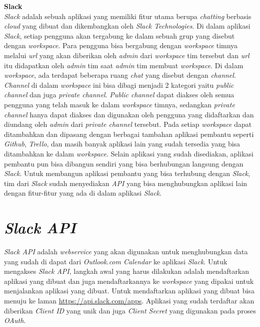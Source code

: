 \textbf{Slack}\\
\textit{Slack} adalah sebuah aplikasi yang memiliki fitur utama berupa \textit{chatting} berbasis \textit{cloud} yang dibuat dan dikembangkan oleh \textit{Slack Technologies}. Di dalam aplikasi \textit{Slack}, setiap pengguna akan tergabung ke dalam sebuah grup yang disebut dengan \textit{workspace}. Para pengguna bisa bergabung dengan \textit{workspace} timnya melalui \textit{url} yang akan diberikan oleh \textit{admin} dari \textit{workspace} tim tersebut dan \textit{url} itu didapatkan oleh \textit{admin} tim saat \textit{admin} tim membuat \textit{workspace}. Di dalam \textit{workspace}, ada terdapat beberapa ruang \textit{chat} yang disebut dengan \textit{channel}. \textit{Channel} di dalam \textit{workspace} ini bisa dibagi menjadi 2 kategori yaitu \textit{public channel} dan juga \textit{private channel}. \textit{Public channel} dapat diakses oleh semua pengguna yang telah masuk ke dalam \textit{workspace} timnya, sedangkan \textit{private channel} hanya dapat diakses dan digunakan oleh pengguna yang didaftarkan dan diundang oleh \textit{admin} dari \textit{private channel} tersebut. Pada setiap \textit{workspace} dapat ditambahkan dan dipasang dengan berbagai tambahan aplikasi pembantu seperti \textit{Github}, \textit{Trello}, dan masih banyak aplikasi lain yang sudah tersedia yang bisa ditambahkan ke dalam \textit{workspace}. Selain aplikasi yang sudah disediakan, aplikasi pembantu pun bisa dibangun sendiri yang bisa berhubungan langsung dengan \textit{Slack}. Untuk membangun aplikasi pembantu yang bisa terhubung dengan \textit{Slack}, tim dari \textit{Slack} sudah menyediakan \textit{API} yang bisa menghubungkan aplikasi lain dengan fitur-fitur yang ada di dalam aplikasi \textit{Slack}. 

\section{\textit{Slack API}}
\label{sec:slackAPI}
\textit{Slack API} adalah \textit{webservice} yang akan digunakan untuk menghubungkan data yang sudah di dapat dari \textit{Outlook.com Calendar} ke aplikasi \textit{Slack}.\cite{slack} Untuk mengakses \textit{Slack API}, langkah awal yang harus dilakukan adalah mendaftarkan aplikasi yang dibuat dan juga mendaftarkannya ke \textit{workspace} yang dipakai untuk menjalankan aplikasi yang dibuat. Untuk mendaftarkan aplikasi yang dibuat bisa menuju ke laman \url{https://api.slack.com/apps}. Aplikasi yang sudah terdaftar akan diberikan \textit{Client ID} yang unik dan juga \textit{Client Secret} yang digunakan pada proses \textit{OAuth}. 

